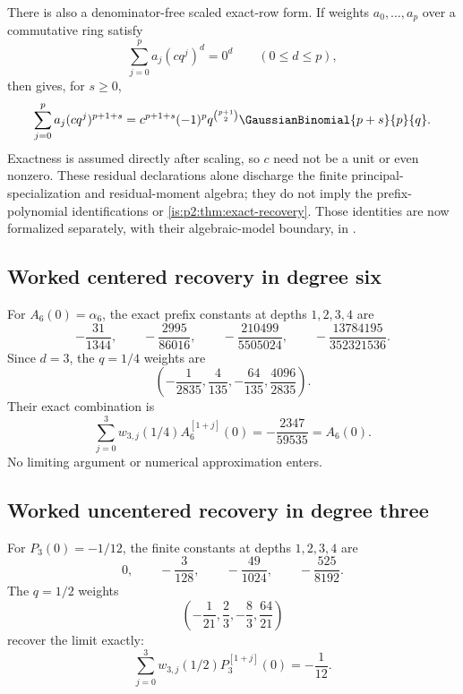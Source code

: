 There is also a denominator-free scaled exact-row form.  If weights
\(a_0,\ldots,a_p\) over a commutative ring satisfy
\[
 \sum_{j=0}^{p}a_j(cq^j)^d=0^d\qquad(0\le d\le p),
\]
then  gives, for \(s\ge0\),
\[
 \sum_{j=0}^{p}a_j(cq^j)^{p+1+s}
 =c^{p+1+s}(-1)^p q^{\binom{p+1}{2}}\GaussianBinomial{p+s}{p}{q}.
\]
Exactness is assumed directly after scaling, so \(c\) need not be a unit or
even nonzero.  These residual declarations alone discharge the finite
principal-specialization and residual-moment algebra; they do not imply the
prefix-polynomial identifications or \cref{is:p2:thm:exact-recovery}.  Those
identities are now formalized separately, with their algebraic-model boundary,
in .

\subsection{Worked centered recovery in degree six}

For $A_6(0)=\alpha_6$, the exact prefix constants at depths $1,2,3,4$ are
\begin{equation}
 -\frac{31}{1344},
 \qquad
 -\frac{2995}{86016},
 \qquad
 -\frac{210499}{5505024},
 \qquad
 -\frac{13784195}{352321536}.
 \label{is:p2:eq:A6-prefix-values}
\end{equation}
Since $d=3$, the $q=1/4$ weights are
\begin{equation}
 \left(
 -\frac1{2835},\frac4{135},-\frac{64}{135},\frac{4096}{2835}
 \right).
 \label{is:p2:eq:q14-weights3}
\end{equation}
Their exact combination is
\begin{equation}
 \sum_{j=0}^{3}w_{3,j}(1/4)A_6^{[1+j]}(0)
 =-\frac{2347}{59535}=A_6(0).
 \label{is:p2:eq:A6-exact-example}
\end{equation}
No limiting argument or numerical approximation enters.

\subsection{Worked uncentered recovery in degree three}

For $P_3(0)=-1/12$, the finite constants at depths $1,2,3,4$ are
\begin{equation}
 0,
 \qquad -\frac3{128},
 \qquad -\frac{49}{1024},
 \qquad -\frac{525}{8192}.
 \label{is:p2:eq:P3-prefix-values}
\end{equation}
The $q=1/2$ weights
\begin{equation}
 \left(-\frac1{21},\frac23,-\frac83,\frac{64}{21}\right)
 \label{is:p2:eq:q12-weights3}
\end{equation}
recover the limit exactly:
\begin{equation}
 \sum_{j=0}^{3}w_{3,j}(1/2)P_3^{[1+j]}(0)=-\frac1{12}.
 \label{is:p2:eq:P3-exact-example}
\end{equation}

